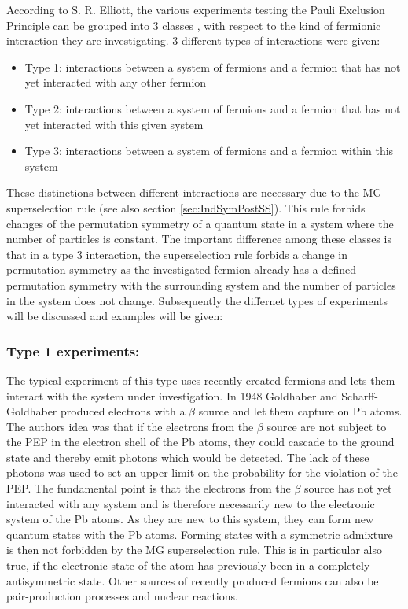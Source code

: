 According to S. R. Elliott, the various experiments testing the Pauli Exclusion Principle can be grouped into 3 classes \cite{Elliott2012}, with respect to the kind of fermionic interaction they are investigating. 3 different types of interactions were given:
\begin{itemize}
 \item Type 1: interactions between a system of fermions and a fermion that has not yet interacted with any other fermion
 \item Type 2: interactions between a system of fermions and a fermion that has not yet interacted with this given system
 \item Type 3: interactions between a system of fermions and a fermion within this system
\end{itemize}
These distinctions between different interactions are necessary due to the MG superselection rule (see also section \ref{sec:IndSymPostSS}). This rule forbids changes of the permutation symmetry of a quantum state in a system where the number of particles is constant. The important difference among these classes is that in a type 3 interaction, the superselection rule forbids a change in permutation symmetry as the investigated fermion already has a defined permutation symmetry with the surrounding system and the number of particles in the system does not change. Subsequently the differnet types of experiments will be discussed and examples will be given:

\subsubsection{Type 1 experiments:}

The typical experiment of this type uses recently created fermions and lets them interact with the system under investigation. In 1948 Goldhaber and Scharff-Goldhaber \cite{Goldhaber1948} produced electrons with a $\beta$ source and let them capture on Pb atoms. The authors idea was that if the electrons from the $\beta$ source are not subject to the PEP in the electron shell of the Pb atoms, they could cascade to the ground state and thereby emit photons which would be detected. The lack of these photons was used to set an upper limit on the probability for the violation of the PEP. The fundamental point is that the electrons from the $\beta$ source has not yet interacted with any system and is therefore necessarily new to the electronic system of the Pb atoms. As they are new to this system, they can form new quantum states with the Pb atoms. Forming states with a symmetric admixture is then not forbidden by the MG superselection rule. This is in particular also true, if the electronic state of the atom has previously been in a completely antisymmetric state. Other sources of recently produced fermions can also be pair-production processes and nuclear reactions.

